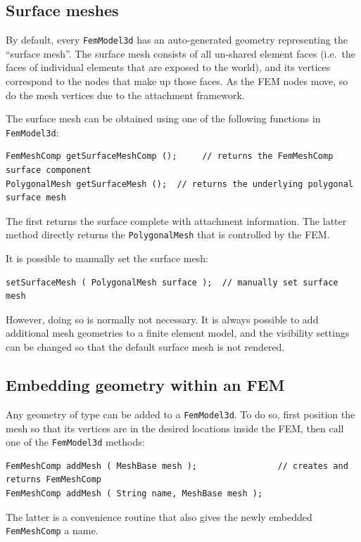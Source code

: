 \subsection{Surface meshes}

By default, every {\tt FemModel3d} has an auto-generated geometry representing
the ``surface mesh''.  The surface mesh consists of all un-shared element faces
(i.e.~the faces of individual elements that are exposed to the world), and its
vertices correspond to the nodes that make up those faces.  As the FEM nodes
move, so do the mesh vertices due to the attachment framework.

The surface mesh can be obtained using one of the following functions in 
{\tt FemModel3d}:
\begin{lstlisting}[]
FemMeshComp getSurfaceMeshComp ();     // returns the FemMeshComp surface component
PolygonalMesh getSurfaceMesh ();  // returns the underlying polygonal surface mesh
\end{lstlisting}
The first returns the surface complete with attachment information.  The latter 
method directly returns the {\tt PolygonalMesh} that is controlled by the FEM.  

It is possible to manually set the surface mesh:
\begin{lstlisting}[]
setSurfaceMesh ( PolygonalMesh surface );  // manually set surface mesh
\end{lstlisting}
However, doing so is normally not necessary.  It is always possible to add
additional mesh geometries to a finite element model, and the visibility
settings can be changed so that the default surface mesh is not rendered.  

\subsection{Embedding geometry within an FEM}
\label{FEMmeshEmbedding:sec}

Any geometry of type  can be
added to a {\tt FemModel3d}.  To do so, first position the mesh so
that its vertices are in the desired locations inside the FEM, then
call one of the {\tt FemModel3d} methods:
\begin{lstlisting}[]
FemMeshComp addMesh ( MeshBase mesh );                // creates and returns FemMeshComp
FemMeshComp addMesh ( String name, MeshBase mesh );
\end{lstlisting}
The latter is a convenience routine that also gives the newly embedded
{\tt FemMeshComp} a name.


